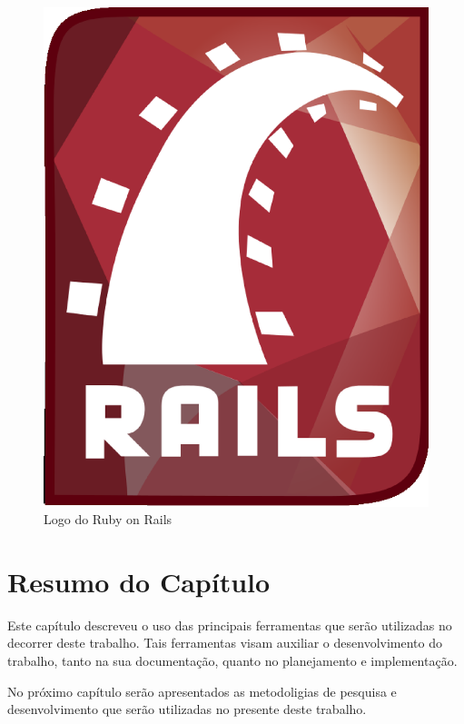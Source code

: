 \begin{figure}[!h]
	\centering
	\includegraphics[scale=0.1]{figuras/capitulo3/ruby_on_rails.eps}
	\caption{Logo do Ruby on Rails}
	\label{ruby_on_rails}
\end{figure}

\section{Resumo do Capítulo}

Este capítulo descreveu o uso das principais ferramentas que serão utilizadas no decorrer deste trabalho. Tais ferramentas visam auxiliar o desenvolvimento do trabalho, tanto na sua documentação, quanto no planejamento e implementação.

No próximo capítulo serão apresentados as metodoligias de pesquisa e desenvolvimento que serão utilizadas no presente deste trabalho.
